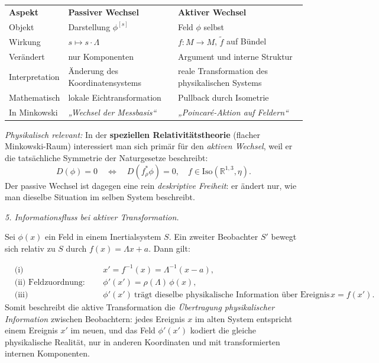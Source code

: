 \documentclass[10pt, letterpaper]{article}
\newcommand{\R}{\mathbb{R}}
\newcommand{\Iso}{\mathrm{Iso}}
\begin{document}
\begin{center}
\renewcommand{\arraystretch}{1.4}
\begin{tabular}{@{}lll@{}}
\textbf{Aspekt} & \textbf{Passiver Wechsel} & \textbf{Aktiver Wechsel} \\
Objekt & Darstellung $\phi^{[s]}$ & Feld $\phi$ selbst \\
Wirkung & $s\mapsto s\cdot\Lambda$ & $f:M\to M$, $\tilde f$ auf Bündel \\
Verändert & nur Komponenten & Argument und interne Struktur \\
Interpretation & Änderung des Koordinatensystems & reale Transformation des physikalischen Systems \\
Mathematisch & lokale Eichtransformation & Pullback durch Isometrie \\
In Minkowski & \textit{„Wechsel der Messbasis“} & \textit{„Poincaré-Aktion auf Feldern“} \\
\end{tabular}
\end{center}

\smallskip
\emph{Physikalisch relevant:}
In der \textbf{speziellen Relativitätstheorie} (flacher Minkowski-Raum)
interessiert man sich primär für den \emph{aktiven Wechsel}, 
weil er die tatsächliche Symmetrie der Naturgesetze beschreibt:
\[
D(\phi)=0 \quad\Longleftrightarrow\quad D(f^*_\rho\phi)=0,
\quad f\in\Iso(\R^{1,3},\eta).
\]
Der passive Wechsel ist dagegen eine rein \emph{deskriptive Freiheit}:
er ändert nur, wie man dieselbe Situation im selben System beschreibt.

\bigskip
\emph{5. Informationsfluss bei aktiver Transformation.}

Sei $\phi(x)$ ein Feld in einem Inertialsystem $S$.  
Ein zweiter Beobachter $S'$ bewegt sich relativ zu $S$ durch $f(x)=\Lambda x+a$.
Dann gilt:

\[
\begin{aligned}
&\text{(i) Ereigniszuordnung:} &&x' = f^{-1}(x) = \Lambda^{-1}(x - a),\\[2pt]
&\text{(ii) Feldzuordnung:} &&\phi'(x') = \rho(\Lambda)\,\phi(x),\\[2pt]
&\text{(iii) Informationsfluss:} &&\phi'(x')\ \text{trägt dieselbe physikalische Information über Ereignis }x=f(x'). 
\end{aligned}
\]
Somit beschreibt die aktive Transformation die \emph{Übertragung physikalischer Information}
zwischen Beobachtern: jedes Ereignis $x$ im alten System entspricht einem Ereignis $x'$
im neuen, und das Feld $\phi'(x')$ kodiert die gleiche physikalische Realität, nur in
anderen Koordinaten und mit transformierten internen Komponenten.
\end{document}
